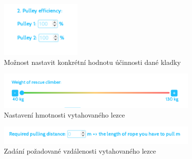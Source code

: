\begin{figure}[!hbt]
    \centering
    \includegraphics[width=4.0cm]{Figures/WebApplication/3_Web_application.png}
    \caption[3_Aplikace]{Možnost nastavit konkrétní hodnotu účinnosti dané kladky}
    \label{Obr:3_application}
\end{figure} 

\begin{figure}[!hbt]
    \centering
    \includegraphics[width=10.0cm]{Figures/WebApplication/4_Web_application.png}
    \caption[4_Aplikace]{Nastavení hmotnosti vytahovaného lezce}
    \label{Obr:4_application}
\end{figure} 

\begin{figure}[!hbt]
    \centering
    \includegraphics[width=10.0cm]{Figures/WebApplication/5_Web_application.png}
    \caption[5_Aplikace]{Zadání požadované vzdálenosti vytahovaného lezce}
    \label{Obr:5_application}
\end{figure} 


